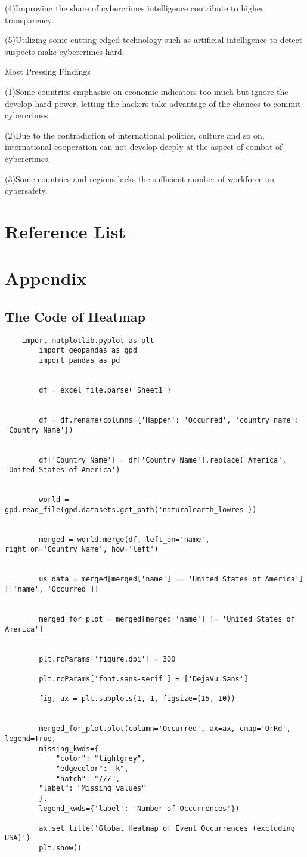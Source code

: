 \documentclass[12pt]{article}
\begin{document}
	(4)Improving the share of cybercrimes intelligence contribute to higher transparency.

	(5)Utilizing some cutting-edged technology such as artificial intelligence to detect suspects make cybercrimes hard.

\begin{flushleft}
		Most Pressing Findings
\end{flushleft}

	(1)Some countries emphasize on economic indicators too much but ignore the develop hard power, letting the hackers take advantage of the chances to commit cybercrimes.

	(2)Due to the contradiction of international politics, culture and so on, international cooperation can not develop deeply at the aspect of combat of cybercrimes.

	(3)Some countries and regions lacks the sufficient number of workforce on cybersafety.
	
	\section{Reference List}
	
	
	\section{Appendix}
	\subsection{The Code of Heatmap}
	
	\begin{verbatim}
	import matplotlib.pyplot as plt
		import geopandas as gpd
		import pandas as pd
		

		df = excel_file.parse('Sheet1')
		

		df = df.rename(columns={'Happen': 'Occurred', 'country_name': 'Country_Name'})
		

		df['Country_Name'] = df['Country_Name'].replace('America', 'United States of America')
		

		world = gpd.read_file(gpd.datasets.get_path('naturalearth_lowres'))
		

		merged = world.merge(df, left_on='name', right_on='Country_Name', how='left')
		

		us_data = merged[merged['name'] == 'United States of America'][['name', 'Occurred']]
		

		merged_for_plot = merged[merged['name'] != 'United States of America']
		

		plt.rcParams['figure.dpi'] = 300

		plt.rcParams['font.sans-serif'] = ['DejaVu Sans']

		fig, ax = plt.subplots(1, 1, figsize=(15, 10))
		

		merged_for_plot.plot(column='Occurred', ax=ax, cmap='OrRd', legend=True,
		missing_kwds={
			"color": "lightgrey",
			"edgecolor": "k",
			"hatch": "///",
		"label": "Missing values"
		},
		legend_kwds={'label': 'Number of Occurrences'})

		ax.set_title('Global Heatmap of Event Occurrences (excluding USA)')
		plt.show()
	\end{verbatim}
\end{document}
